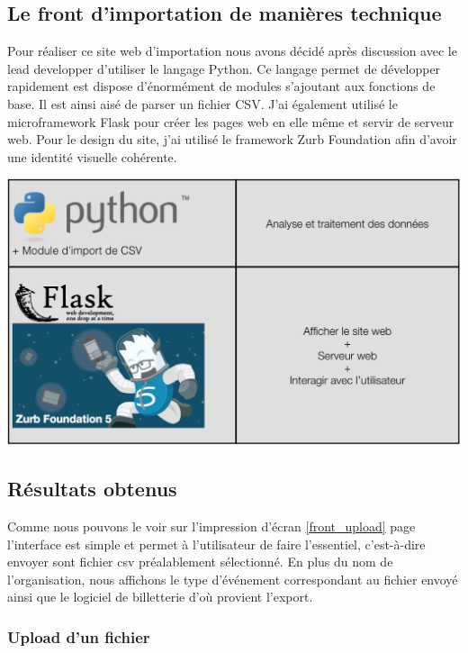 \subsection{Le front d'importation de manières technique}

Pour réaliser ce site web d'importation nous avons décidé après discussion avec le lead developper d'utiliser le langage Python. Ce langage permet de développer rapidement est dispose d'énormément de modules s'ajoutant aux fonctions de base. Il est ainsi aisé de parser un fichier CSV. J'ai également utilisé le microframework Flask pour créer les pages web en elle même et servir de serveur web. Pour le design du site, j'ai utilisé le framework Zurb Foundation afin d'avoir une identité visuelle cohérente. 

\begin{center}
\includegraphics[scale=0.7]{images/datafit2.png}
\label{interface_upload_tech}
\end{center}

\subsection{Résultats obtenus}

Comme nous pouvons le voir sur l'impression d'écran \ref{front_upload} page \pageref{front_upload} l'interface est simple et permet à l'utilisateur de faire l'essentiel, c'est-à-dire envoyer sont fichier csv préalablement sélectionné.
En plus du nom de l'organisation, nous affichons le type d'événement correspondant au fichier envoyé ainsi que le logiciel de billetterie d'où provient l'export. \\

\subsubsection{Upload d'un fichier}

